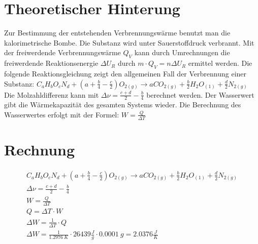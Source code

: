 \section{Theoretischer Hinterung}
	Zur Bestimmung der entstehenden Verbrennungswärme benutzt man die kalorimetrische Bombe. 
	Die Substanz wird unter Sauerstoffdruck verbrannt. 
	Mit der freiwerdende Verbrennungswärme $Q_V$ kann durch Umrechnungen die freiwerdende Reaktionsenergie $\Delta U_R$ durch $m\cdot Q_V = n\Delta U_R$ ermittel werden.
	Die folgende Reaktionsgleichung zeigt den allgemeinen Fall der Verbrennung einer Substanz:
	 $	C_aH_bO_cN_d + \left( a + \frac{b}{4} - \frac{c}{2} \right) O_{2(g)} \rightarrow aCO_{2(g)} + \frac{b}{2} H_2O_{(1)} + \frac{d}{2} N_{2(g)} $ 
	 Die Molzahldifferenz kann mit 
	 $	\Delta \nu = \frac{c + d}{2} - \frac{b}{4} $ berechnet werden. 
	Der Wasserwert gibt  die Wärmekapazität des gesamten Systems wieder. 
	Die Berechnung des Wasserwertes erfolgt mit der Formel:
	 $	W = \frac{Q}{\Delta T} $
	\section{Rechnung}
	\begin{eqnarray}
		C_aH_bO_cN_d + \left( a + \frac{b}{4} - \frac{c}{2} \right) O_{2(g)} \rightarrow aCO_{2(g)} + \frac{b}{2} H_2O_{(1)} + \frac{d}{2} N_{2(g)}\\	
		\Delta \nu = \frac{c + d}{2} - \frac{b}{4}\\
		W = \frac{Q}{\Delta T}\\
		Q = \Delta T \cdot W\\
		\Delta W = \frac{1}{\Delta T}\cdot Q\\
		\Delta W = \frac{1}{1.2976\ K}\cdot 26439 \frac{J}{g}\cdot 0.0001\ g = 2.0376 \frac{J}{K}
	\end{eqnarray}
